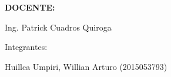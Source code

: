 \documentclass[12pt, letterpaper]{article}
\begin{document}
\begin{titlepage}
\begin{center}
		\vspace*{0.3in}
			\begin{large}
				\textbf{DOCENTE:} \\
			\end{large}

		\vspace*{0.1in}
			\begin{large}
				Ing. Patrick Cuadros Quiroga \\
			\end{large}

		\vspace*{0.2in}
			\vspace*{0.1in}
				\begin{large}
					Integrantes: \\
					\begin{flushleft}
						Huillca Umpiri, Willian Arturo	\hfill	(2015053793) \\
					\end{flushleft}
				\end{large}
	\end{center}
\end{titlepage}

\tableofcontents %
	\thispagestyle{empty} %
		\newpage
			\setcounter{page}{1}%
				
				
				
				
\end{document}
